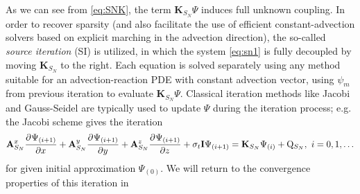 As we can see from \eqref{eq:SNK}, the term $\mathbf{K}_{S_N}\Psi$ induces full unknown coupling. In order to recover 
sparsity (and also facilitate the use of efficient constant-advection solvers based on explicit marching in the
advection  direction), the so-called  \textit{source iteration} (SI)  is utilized, in which the system \eqref{eq:sn1} is
fully decoupled by moving $\mathbf{K}_{S_N}$ to the right. Each equation is solved separately using any method suitable for an advection-reaction PDE with constant
advection vector, using $\psi_m$ from previous iteration to evaluate $\mathbf{K}_{S_N}\Psi$. Classical iteration methods
like Jacobi and Gauss-Seidel are typically used to update $\Psi$ during the iteration process; e.g. the Jacobi scheme 
gives the iteration
\begin{equation}\label{eq:SI}
	\mat{A}_{S_N}^x\pd{\Psi_{(i+1)}}{x} + \mat{A}_{S_N}^y\pd{\Psi_{(i+1)}}{y} +
	\mat{A}_{S_N}^z\pd{\Psi_{(i+1)}}{z} + \sigma_t\mat{I}\Psi_{(i+1)}= \mathbf{K}_{S_N}\Psi_{(i)} +
	\mathrm{Q}_{S_N},\ 
	i = 0,1,\ldots
\end{equation}
for given initial approximation $\Psi_{(0)}$. We will return to the convergence properties of this iteration in
\sref{sec:SI}

